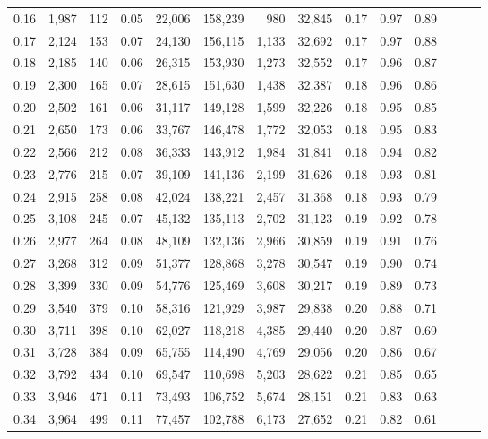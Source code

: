\begin{tabular}{rrrrrrrrrrrrrr}
0.16 &  1,987 &  112 &  0.05 &   22,006 &  158,239 &     980 &  32,845 &  0.17 &  0.97 &      0.89 \\
0.17 &  2,124 &  153 &  0.07 &   24,130 &  156,115 &   1,133 &  32,692 &  0.17 &  0.97 &      0.88 \\
0.18 &  2,185 &  140 &  0.06 &   26,315 &  153,930 &   1,273 &  32,552 &  0.17 &  0.96 &      0.87 \\
0.19 &  2,300 &  165 &  0.07 &   28,615 &  151,630 &   1,438 &  32,387 &  0.18 &  0.96 &      0.86 \\
0.20 &  2,502 &  161 &  0.06 &   31,117 &  149,128 &   1,599 &  32,226 &  0.18 &  0.95 &      0.85 \\
0.21 &  2,650 &  173 &  0.06 &   33,767 &  146,478 &   1,772 &  32,053 &  0.18 &  0.95 &      0.83 \\
0.22 &  2,566 &  212 &  0.08 &   36,333 &  143,912 &   1,984 &  31,841 &  0.18 &  0.94 &      0.82 \\
0.23 &  2,776 &  215 &  0.07 &   39,109 &  141,136 &   2,199 &  31,626 &  0.18 &  0.93 &      0.81 \\
0.24 &  2,915 &  258 &  0.08 &   42,024 &  138,221 &   2,457 &  31,368 &  0.18 &  0.93 &      0.79 \\
0.25 &  3,108 &  245 &  0.07 &   45,132 &  135,113 &   2,702 &  31,123 &  0.19 &  0.92 &      0.78 \\
0.26 &  2,977 &  264 &  0.08 &   48,109 &  132,136 &   2,966 &  30,859 &  0.19 &  0.91 &      0.76 \\
0.27 &  3,268 &  312 &  0.09 &   51,377 &  128,868 &   3,278 &  30,547 &  0.19 &  0.90 &      0.74 \\
0.28 &  3,399 &  330 &  0.09 &   54,776 &  125,469 &   3,608 &  30,217 &  0.19 &  0.89 &      0.73 \\
0.29 &  3,540 &  379 &  0.10 &   58,316 &  121,929 &   3,987 &  29,838 &  0.20 &  0.88 &      0.71 \\
0.30 &  3,711 &  398 &  0.10 &   62,027 &  118,218 &   4,385 &  29,440 &  0.20 &  0.87 &      0.69 \\
0.31 &  3,728 &  384 &  0.09 &   65,755 &  114,490 &   4,769 &  29,056 &  0.20 &  0.86 &      0.67 \\
0.32 &  3,792 &  434 &  0.10 &   69,547 &  110,698 &   5,203 &  28,622 &  0.21 &  0.85 &      0.65 \\
0.33 &  3,946 &  471 &  0.11 &   73,493 &  106,752 &   5,674 &  28,151 &  0.21 &  0.83 &      0.63 \\
0.34 &  3,964 &  499 &  0.11 &   77,457 &  102,788 &   6,173 &  27,652 &  0.21 &  0.82 &      0.61 \\

\end{tabular}
